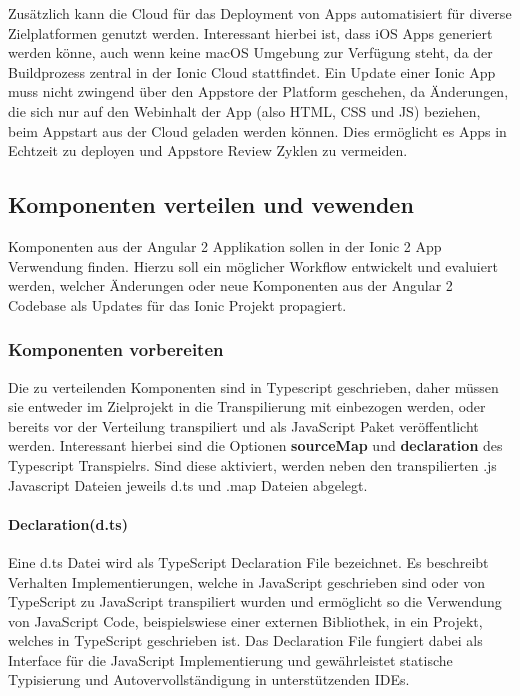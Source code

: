 Zusätzlich kann die Cloud für das Deployment von Apps automatisiert für diverse Zielplatformen genutzt werden.
Interessant hierbei ist, dass iOS Apps generiert werden könne, auch wenn
keine macOS Umgebung zur Verfügung steht, da der Buildprozess zentral in der Ionic Cloud stattfindet.
Ein Update einer Ionic App muss nicht zwingend über den Appstore der Platform geschehen,
da Änderungen, die sich nur auf den Webinhalt der App (also HTML, CSS und JS) beziehen,
beim Appstart aus der Cloud geladen werden können.
Dies ermöglicht es Apps in Echtzeit zu deployen und Appstore Review Zyklen zu vermeiden.

\subsection{Komponenten verteilen und vewenden}

Komponenten aus der Angular 2 Applikation sollen in der Ionic 2 App Verwendung finden.
Hierzu soll ein möglicher Workflow entwickelt und evaluiert werden, welcher Änderungen oder neue Komponenten
aus der Angular 2 Codebase als Updates für das Ionic Projekt propagiert.

\subsubsection{Komponenten vorbereiten}

Die zu verteilenden Komponenten sind in Typescript geschrieben,
daher müssen sie entweder im Zielprojekt in die Transpilierung mit einbezogen werden,
oder bereits vor der Verteilung transpiliert und als JavaScript Paket veröffentlicht werden.
Interessant hierbei sind die Optionen \textbf{sourceMap} und \textbf{declaration} des Typescript Transpielrs.
Sind diese aktiviert, werden neben den transpilierten .js Javascript Dateien jeweils d.ts und .map Dateien abgelegt.

\paragraph{Declaration(d.ts)}

Eine d.ts Datei wird als TypeScript Declaration File bezeichnet.
Es beschreibt Verhalten Implementierungen, welche in JavaScript geschrieben sind oder von TypeScript zu JavaScript transpiliert wurden
und ermöglicht so die Verwendung von JavaScript Code, beispielswiese einer externen Bibliothek,
in ein Projekt, welches in TypeScript geschrieben ist. Das Declaration File fungiert dabei als Interface
für die JavaScript Implementierung und gewährleistet statische Typisierung
und Autovervollständigung in unterstützenden IDEs.

